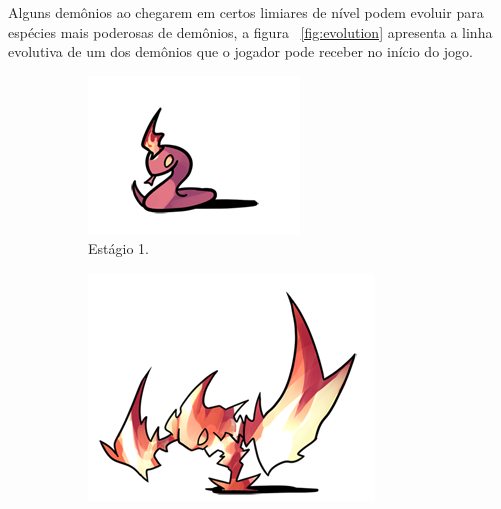 	Alguns demônios ao chegarem em certos limiares de nível podem evoluir para espécies mais poderosas de demônios, a figura ~\ref{fig:evolution} apresenta a linha evolutiva de um dos demônios que o jogador pode receber no início do jogo.
	
\begin{figure}[h!]
  \centering
  \begin{subfigure}[b]{0.2\linewidth}
    \includegraphics[width=\linewidth]{stage1.png}
     \caption{Estágio 1.}
  \end{subfigure}
  \begin{subfigure}[b]{0.3\linewidth}
    \includegraphics[width=\linewidth]{stage2.png}

\end{subfigure}
\end{figure}
